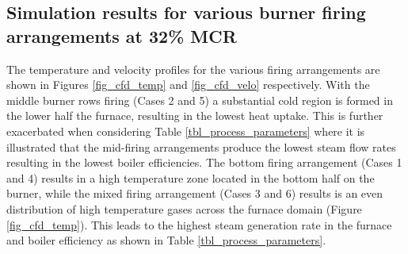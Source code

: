 \documentclass[twocolumn,10pt]{asme2ej}
\begin{document}
\subsection{Simulation results for various burner firing arrangements at 32\% MCR }
The temperature and velocity profiles for the various firing arrangements are shown in Figures \ref{fig_cfd_temp} and \ref{fig_cfd_velo} respectively. With the middle burner rows firing (Cases 2 and 5) a substantial cold region is formed in the lower half the furnace, resulting in the lowest heat uptake. This is further exacerbated when considering Table \ref{tbl_process_parameters} where it is illustrated that the mid-firing arrangements produce the lowest steam flow rates resulting in the lowest boiler efficiencies. The bottom firing arrangement (Cases 1 and 4) results in a high temperature zone located in the bottom half on the burner, while the mixed firing arrangement (Cases 3 and 6) results is an even distribution of high temperature gases across the furnace domain (Figure \ref{fig_cfd_temp}). This leads to the highest steam generation rate in the furnace and boiler efficiency as shown in Table \ref{tbl_process_parameters}.\\
\end{document}
